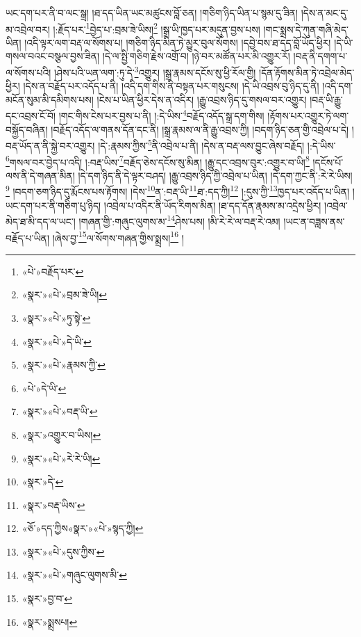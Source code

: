 ཡང་དག་པར་ནི་བ་ལང་སྒྲ། །ཐ་དད་ཡིན་ཡང་མཚུངས་བློ་ཅན། །གཅིག་ཉིད་ཡིན་པ་སྙམ་དུ་ཟིན། །དེས་ན་མང་དུ་མ་འབྲེལ་བར། །:རྗོད་པར་\footnote{«པེ་»བརྗོད་པར་}བྱེད་པ་:བྲམ་ཟེ་ཡིས།\footnote{«སྣར་»«པེ་»བྲམ་ཟེ་ཡི།} །སྒྲ་ཡི་ཁྱད་པར་མདུན་བྱས་པས། །གང་སྨྲས་དེ་ཀུན་གཞི་མེད་ཡིན། །འདི་ལྟར་ལག་བརྡ་ལ་སོགས་པ། །གཅིག་ཉིད་མིན་ཏེ་མྱུར་བུལ་སོགས། །དབྱེ་བས་ཐ་དད་བློ་ཡོད་ཕྱིར། །དེ་ཡི་གསལ་བའང་བསྩལ་བྱས་ཟིན། །དེ་ལ་སྤྱི་གཅིག་རྗེས་འགྲོ་བ། །ཉེ་བར་མཚོན་པར་མི་འགྱུར་རོ། །བརྡ་ནི་དགག་པ་ལ་སོགས་པའི། །ཤེས་པའི་ཡན་ལག་:ཏུ་དེ་\footnote{«སྣར་»«པེ་»ཏུ་སྟེ་}འགྱུར། །སྒྲ་རྣམས་དངོས་སུ་ཕྱི་རོལ་གྱི། །དོན་རྟོགས་མིན་ཏེ་འབྲེལ་མེད་ཕྱིར། །དེས་ན་བརྗོད་པར་འདོད་པ་ནི། །འདི་དག་གིས་ནི་བསྟན་པར་གསུངས། །དེ་ཡི་འབྲས་བུ་ཉིད་དུ་ནི། །འདི་དག་མངོན་སུམ་མི་དམིགས་པས། །ངེས་པ་ཡིན་ཕྱིར་དེས་ན་འདིར། །རྒྱུ་འབྲས་ཉིད་དུ་གསལ་བར་འགྱུར། །བརྡ་ཡི་རྒྱུ་དང་འབྲས་ངོ་བོ། །གང་གིས་ངེས་པར་བྱས་པ་ནི། །:དེ་ཡིས་\footnote{«སྣར་»«པེ་»དེ་ཡི་}བརྗོད་འདོད་སྒྲ་དག་གིས། །རྟོགས་པར་འགྱུར་ཏེ་ལག་བསྐྱོད་བཞིན། །བརྗོད་འདོད་ལ་གནས་དོན་དང་ནི། །སྒྲ་རྣམས་ལ་ནི་རྒྱུ་འབྲས་ཀྱི། །བདག་ཉིད་ཅན་གྱི་འབྲེལ་པ་དེ། །བརྡ་ཡོད་ན་ནི་སྐྱེ་བར་འགྱུར། །དེ་:རྣམས་ཀྱིས་\footnote{«སྣར་»«པེ་»རྣམས་ཀྱི་}ནི་འབྲེལ་པ་ནི། །དེས་ན་བརྡ་ལས་བྱུང་ཞེས་བརྗོད། །:དེ་ཡིས་\footnote{«པེ་»དེ་ཡི་}གསལ་བར་བྱེད་པ་འདི། །:བརྡ་ཡིས་\footnote{«སྣར་»«པེ་»བརྡ་ཡི་}བརྗོད་ཅེས་དངོས་སུ་མིན། །རྒྱུ་དང་འབྲས་བུར་:འགྱུར་བ་ཡི།\footnote{«སྣར་»འགྱུར་བ་ཡིས།} །དངོས་པོ་ལས་ནི་དེ་གཞན་མིན། །དེ་དག་ཉིད་ནི་དེ་ལྟར་བཤད། །རྒྱུ་འབྲས་ཉིད་ཀྱི་འབྲེལ་པ་ཡིན། །དེ་དག་ཀྱང་ནི་:རེ་རེ་ཡིས།\footnote{«སྣར་»«པེ་»རེ་རེ་ཡི།} །བདག་ཅག་ཉིད་དུ་རྨོངས་པས་རྟོགས། །དེས་\footnote{«སྣར་»དེ་}ན་:བརྡ་ཡི་\footnote{«སྣར་»བརྡ་ཡིས་}ཐ་:དད་ཀྱི།\footnote{«ཅོ་»དད་ཀྱིས«སྣར་»«པེ་»སྙད་ཀྱི།} །:དུས་ཀྱི་\footnote{«སྣར་»«པེ་»དུས་ཀྱིས་}ཁྱད་པར་འདོད་པ་ཡིན། །ཡང་དག་པར་ནི་གཅིག་པུ་ཉིད། །འབྲེལ་པ་འདིར་ནི་ཡོད་རིགས་མིན། །ཐ་དད་དོན་རྣམས་མ་འདྲེས་ཕྱིར། །འབྲེལ་མེད་ཐ་མི་དད་ལ་ཡང་། །གཞན་གྱི་:གཞུང་ལུགས་མ་\footnote{«སྣར་»«པེ་»གཞུང་ལུགས་མི་}ཤེས་པས། །མི་རེ་རེ་ལ་བརྡ་རེ་འམ། །ཡང་ན་བཟླས་ནས་བརྗོད་པ་ཡིན། །ཞེས་བྱ་\footnote{«སྣར་»བྱ་བ་}ལ་སོགས་གཞན་གྱིས་སྨྲས།\footnote{«སྣར་»སྨྲསཔ།} །
